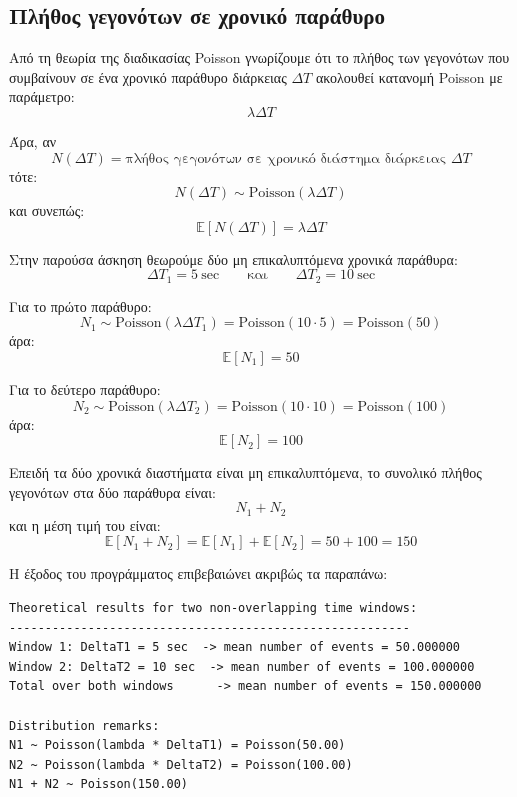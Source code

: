 \documentclass{article}
\begin{document}
\subsection{Πλήθος γεγονότων σε χρονικό παράθυρο}

Από τη θεωρία της διαδικασίας Poisson γνωρίζουμε ότι το πλήθος των γεγονότων που
συμβαίνουν σε ένα χρονικό παράθυρο διάρκειας \(\Delta T\) ακολουθεί κατανομή
Poisson με παράμετρο:
\begin{equation}
    \lambda \Delta T
\end{equation}

Άρα, αν
\[
N(\Delta T) = \text{πλήθος γεγονότων σε χρονικό διάστημα διάρκειας } \Delta T
\]
τότε:
\begin{equation}
    N(\Delta T) \sim \mathrm{Poisson}(\lambda \Delta T)
\end{equation}
και συνεπώς:
\begin{equation}
    \mathbb{E}[N(\Delta T)] = \lambda \Delta T
\end{equation}

Στην παρούσα άσκηση θεωρούμε δύο μη επικαλυπτόμενα χρονικά παράθυρα:
\[
\Delta T_1 = 5\ \text{sec}
\qquad \text{και} \qquad
\Delta T_2 = 10\ \text{sec}
\]

Για το πρώτο παράθυρο:
\[
N_1 \sim \mathrm{Poisson}(\lambda \Delta T_1)
= \mathrm{Poisson}(10 \cdot 5)
= \mathrm{Poisson}(50)
\]
άρα:
\[
\mathbb{E}[N_1] = 50
\]

Για το δεύτερο παράθυρο:
\[
N_2 \sim \mathrm{Poisson}(\lambda \Delta T_2)
= \mathrm{Poisson}(10 \cdot 10)
= \mathrm{Poisson}(100)
\]
άρα:
\[
\mathbb{E}[N_2] = 100
\]

Επειδή τα δύο χρονικά διαστήματα είναι μη επικαλυπτόμενα, το συνολικό πλήθος
γεγονότων στα δύο παράθυρα είναι:
\[
N_1 + N_2
\]
και η μέση τιμή του είναι:
\begin{equation}
    \mathbb{E}[N_1 + N_2]
    =
    \mathbb{E}[N_1] + \mathbb{E}[N_2]
    =
    50 + 100
    =
    150
\end{equation}

Η έξοδος του προγράμματος επιβεβαιώνει ακριβώς τα παραπάνω:

\begin{verbatim}
Theoretical results for two non-overlapping time windows:
--------------------------------------------------------
Window 1: DeltaT1 = 5 sec  -> mean number of events = 50.000000
Window 2: DeltaT2 = 10 sec  -> mean number of events = 100.000000
Total over both windows      -> mean number of events = 150.000000

Distribution remarks:
N1 ~ Poisson(lambda * DeltaT1) = Poisson(50.00)
N2 ~ Poisson(lambda * DeltaT2) = Poisson(100.00)
N1 + N2 ~ Poisson(150.00)
\end{verbatim}
\end{document}
